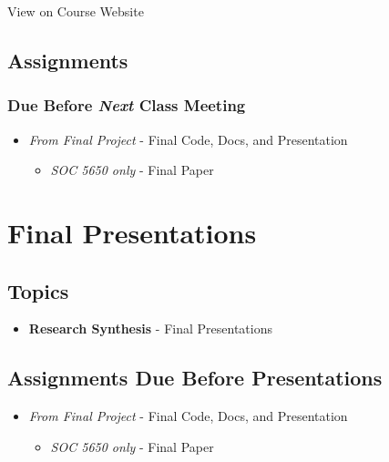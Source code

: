 \documentclass[]{book}
\providecommand{\tightlist}{%
  \setlength{\itemsep}{0pt}\setlength{\parskip}{0pt}}
\begin{document}
View on Course Website

\hypertarget{assignments-18}{%
\subsection*{Assignments}\label{assignments-18}}

\hypertarget{due-before-next-class-meeting}{%
\subsubsection*{\texorpdfstring{Due Before \emph{Next} Class Meeting}{Due Before Next Class Meeting}}\label{due-before-next-class-meeting}}

\begin{itemize}
\tightlist
\item
  \emph{From Final Project} - Final Code, Docs, and Presentation

  \begin{itemize}
  \tightlist
  \item
    \emph{SOC 5650 only} - Final Paper
  \end{itemize}
\end{itemize}

\hypertarget{final-presentations}{%
\section*{Final Presentations}\label{final-presentations}}

\hypertarget{topics-17}{%
\subsection*{Topics}\label{topics-17}}

\begin{itemize}
\tightlist
\item
  \textbf{Research Synthesis} - Final Presentations
\end{itemize}

\hypertarget{assignments-due-before-presentations}{%
\subsection*{Assignments Due Before Presentations}\label{assignments-due-before-presentations}}

\begin{itemize}
\tightlist
\item
  \emph{From Final Project} - Final Code, Docs, and Presentation

  \begin{itemize}
  \tightlist
  \item
    \emph{SOC 5650 only} - Final Paper
  \end{itemize}
\end{itemize}


\end{document}
